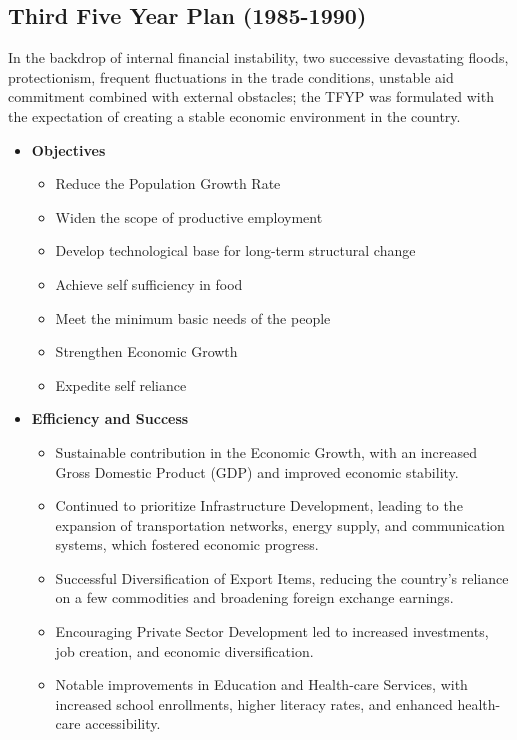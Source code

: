 \subsection{Third Five Year Plan (1985-1990)}
In the backdrop of internal financial instability, two successive devastating floods, 
protectionism, frequent fluctuations in the trade conditions, unstable aid commitment 
combined with external obstacles; the TFYP was formulated with the expectation of 
creating a stable economic environment in the country.\\

\begin{itemize}
	\item\textbf{Objectives}
	\begin{itemize}
		\item Reduce the Population Growth Rate
		\item Widen the scope of productive employment
		\item Develop technological base for long-term structural change
		\item Achieve self sufficiency in food
		\item Meet the minimum basic needs of the people
		\item Strengthen Economic Growth
		\item Expedite self reliance
	\end{itemize}
	
	\item\textbf{Efficiency and Success}
	\begin{itemize}
		\item Sustainable contribution in the Economic Growth, 
		with an increased Gross Domestic Product (GDP) and improved economic stability.
		\item Continued to prioritize Infrastructure Development, leading to the expansion 
		of transportation networks, energy supply, and communication systems, which fostered economic progress.
		\item Successful Diversification of Export Items, reducing the country's reliance on 
		a few commodities and broadening foreign exchange earnings.
		\item Encouraging Private Sector Development led to increased investments, 
		job creation, and economic diversification.
		\item Notable improvements in Education and Health-care Services, with increased school enrollments, 
		higher literacy rates, and enhanced health-care accessibility.
	\end{itemize}
	

\end{itemize}
